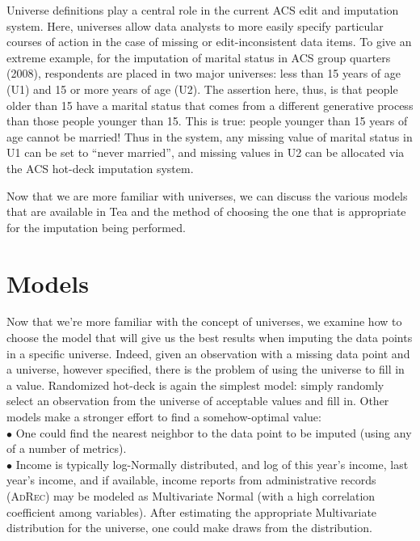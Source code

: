 \documentclass{article}
\def\adrec{\textsc{AdRec}\xspace}
\begin{document}
Universe definitions play a central role in the current ACS edit and imputation system.
Here, universes allow data analysts to more easily specify particular courses of
action in the case of missing or edit-inconsistent data items. To give an extreme example, for the imputation of marital status in ACS group quarters (2008), respondents are placed
in two major universes: less than 15 years of age (U1) and 15 or more years of age
(U2). The assertion here, thus, is that people older than 15 have a marital status
that comes from a different generative process than those people younger than 15.
This is true: people younger than 15 years of age cannot be married!  Thus in the
system, any missing value of marital status in U1 can be set to ``never married'',
and missing values in U2 can be allocated via the ACS hot-deck imputation system.

Now that we are more familiar with universes, we can discuss the various models that are 
available in Tea and the method of choosing the one that is appropriate for the 
imputation being performed.


\section{Models}
Now that we're more familiar with the concept of universes, we examine how to choose the 
model that will give us the best results when imputing the data points in a specific universe.
Indeed, given an observation with a missing data point and a universe, however specified, there is
the problem of using the universe to fill in a value. Randomized hot-deck is again
the simplest model: simply randomly select an observation from the universe of acceptable
values and fill in. Other models make a stronger effort to find a somehow-optimal value:\\

$\bullet$ One could find the nearest neighbor to the data point to be imputed (using any
of a number of metrics).\\

$\bullet$ Income is typically log-Normally distributed, and log of this year's income, last
year's income, and if available, income reports from administrative records (\adrec) may
be modeled as Multivariate Normal (with a high correlation
coefficient among variables). After estimating the appropriate Multivariate
distribution for the universe, one could make draws from the distribution.\\
\end{document}
